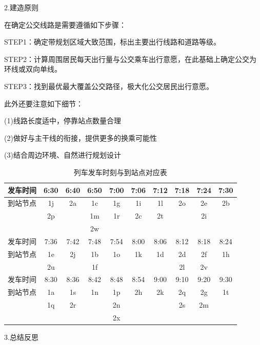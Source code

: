 \documentclass[12pt,a4paper]{mcmthesis}
\begin{document}
    2.建造原则

    在确定公交线路是需要遵循如下步骤：

    STEP1：确定带规划区域大致范围，标出主要出行线路和道路等级。

    STEP2：计算周围居民每天出行量与公交乘车出行意愿，在此基础上确定公交为环线或双向单线。

    STEP3：找到最优最大覆盖公交路径，极大化公交居民出行意愿。


    此外还要注意如下细节：

    (1)线路长度适中，停靠站点数量合理

    (2)做好与主干线的衔接，提供更多的换乘可能性

    (3)结合周边环境、自然进行规划设计

    \begin{table}[h]
        \centering
        \caption{列车发车时刻与到站点对应表}
        \label{tab:p4_timetable}
        \begin{tabular}{c|ccccccccc}
            \hline
            发车时间 & 6:30 & 6:40 & 6:50 & 7:00 & 7:06 & 7:12 & 7:18 & 7:24 & 7:30 \\ \hline
            到站节点 & 1j   & 2a   & 1c   & 1g   & 1i   & 1l   & 2o   & 2e   & 2b   \\
            & 2p   &      & 1m   & 1r   & 2c   & 2t   &      & 2i   &      \\
            &      &      & 2w   &      &      &      &      &      &      \\ \hline
            发车时间 & 7:36 & 7:42 & 7:48 & 7:54 & 8:00 & 8:06 & 8:12 & 8:18 & 8:24 \\
            到站节点 & 1e   & 2j   & 1b   & 1o   & 1k   & 1d   & 2d   & 2f   & 1h   \\
            & 2u   &      & 1f   &      &      &      & 2l   & 2v   &      \\ \hline
            发车时间 & 8:30 & 8:36 & 8:42 & 8:48 & 8:54 & 9:00 & 9:10 & 9:20 & 9:30 \\
            到站节点 & 1a   & 1s   & 1n   & 1p   & 2h   & 2k   & 2q   & 2g   & 1t   \\
            & 1q   & 2r   &      & 2n   &      &      & 2s   & 2m   &      \\
            &      &      &      & 2x   &      &      &      &      &      \\ \hline
        \end{tabular}
    \end{table}

    3.总结反思
\end{document}

